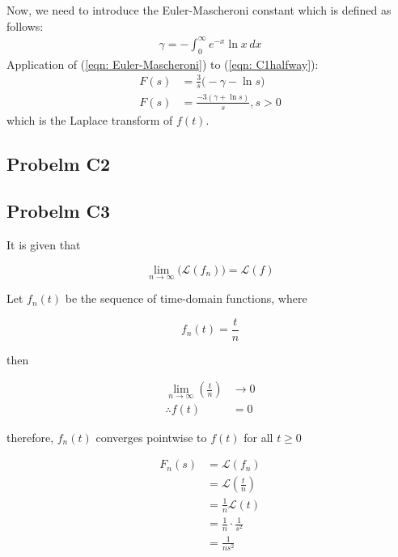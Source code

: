 \documentclass[a4paper,10pt,reqno]{amsart}
\numberwithin{equation}{section}
\newcommand{\lap}{\mathscr{L}}
\begin{document}
Now, we need to introduce the Euler-Mascheroni constant which is defined as follows:
\begin{align}
\gamma = -\int_{0}^{\infty} e^{-x} \ln x \,dx \label{eqn: Euler-Mascheroni}
\end{align}
Application of (\ref{eqn: Euler-Mascheroni}) to (\ref{eqn: C1halfway}):
\begin{align}
F(s) &= \frac{3}{s} \bigg( -\gamma - \ln s \bigg) \nonumber \\
F(s) &= \frac{-3(\gamma + \ln s)}{s}, s>0 \label{eqn: C1final}
\end{align}
which is the Laplace transform of $f(t)$.


\subsection{Probelm C2}\label{sec:c2}

\subsection{Probelm C3}\label{sec:c3}

It is given that

\begin{equation}\label{eq:pntwise_lap}
    \lim_{n \to \infty} \big(\lap\left(f_n\right)\big) = \lap(f)
\end{equation}
\vspace{1pt}

Let $f_n(t)$ be the sequence of time-domain functions, where

\begin{equation}
     f_n(t) = \frac{t}{n}
\end{equation}
\vspace{1pt}

then

\begin{align*}
     \lim_{n \to \infty} \left(\frac{t}{n}\right) &\to 0 \\
     \therefore f(t) &= 0
\end{align*}
\vspace{1pt}

therefore, $f_n(t)$ converges pointwise to $f(t)$ for all $t\geq0$

\begin{align*}
    F_n(s) &= \lap\left(f_n\right) \\
    &= \lap\left(\frac{t}{n}\right) \\
    &= \frac{1}{n} \lap\left(t\right) \\
    &= \frac{1}{n} \cdot \frac{1}{s^2} \\
    &= \frac{1}{ns^2}
\end{align*}
\end{document}
